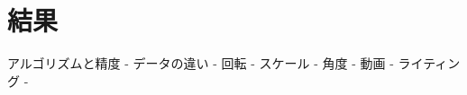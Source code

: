 \section{結果}
アルゴリズムと精度
    - データの違い
        - 回転
        - スケール
        - 角度
        - 動画
        - ライティング
    - 